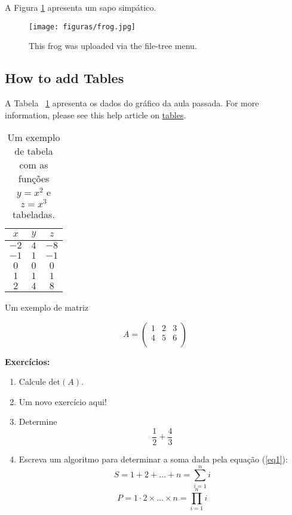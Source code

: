 \documentclass[11pt]{article}
\begin{document}
A Figura \ref{fig:frog} apresenta um sapo simpático.

\begin{figure}[!htb]
\centering
\texttt{[image: figuras/frog.jpg]}
\caption{\label{fig:frog}This frog was uploaded via the file-tree menu.}
\end{figure}




\subsection{How to add Tables}

A Tabela ~\ref{tab1} apresenta os dados do gráfico da aula passada. For more information, please see this help article on \href{https://www.overleaf.com/learn/latex/tables}{tables}. 

\begin{table}[!h]
\centering
\begin{tabular}{|c|c|c|}
\hline
$x$ & $y$ & $z$ \\\hline \hline
$-2$ & $4$ & $-8$ \\
$-1$ & $1$ & $-1$ \\
$0$ & $0$ & $0$ \\
$1$ & $1$ & $1$ \\
$2$ &  $4$ & $8$\\
\hline
\end{tabular}
\caption{\label{tab1} Um exemplo de tabela com as funções $y = x^2$ e $z = x^3$ tabeladas.}
\end{table}

Um exemplo de matriz

$$ A = \left (\begin{array}{ccc}
1 & 2 & 3 \\
4 & 5 & 6 \\
\end{array}\right)
$$

{\bf Exercícios:}
\begin{enumerate}
\item Calcule $\mbox{det}(A)$.
\item Um novo exercício aqui!
\item Determine $$\dfrac{1}{2}+\dfrac{4}{3}$$
\item Escreva um algoritmo para determinar a soma dada pela equação (\ref{eq1}):
\begin{equation}\label{eq1}
    S = 1 + 2 + \ldots + n = \sum_{i=1}^n i
\end{equation}
\begin{equation} 
P = 1 \cdot 2 \times  \ldots \times n = \prod_{i=1}^n i
\end{equation}
\end{enumerate}
\end{document}
